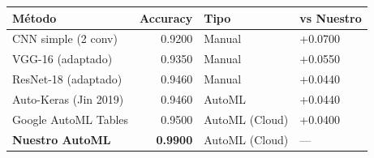 \begin{tabular}{lrll}
\toprule
Método & Accuracy & Tipo & vs Nuestro \\
\midrule
CNN simple (2 conv) & 0.9200 & Manual & +0.0700 \\
VGG-16 (adaptado) & 0.9350 & Manual & +0.0550 \\
ResNet-18 (adaptado) & 0.9460 & Manual & +0.0440 \\
Auto-Keras (Jin 2019) & 0.9460 & AutoML & +0.0440 \\
Google AutoML Tables & 0.9500 & AutoML (Cloud) & +0.0400 \\
\midrule
\textbf{Nuestro AutoML} & \textbf{0.9900} & AutoML (Cloud) & --- \\
\bottomrule
\end{tabular}